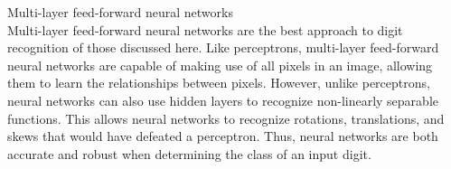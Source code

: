 \documentclass[solution, letterpaper]{cs121}
\begin{document}
\subproblem Multi-layer feed-forward neural networks \\

Multi-layer feed-forward neural networks are the best approach to digit recognition of those discussed here. Like perceptrons, multi-layer feed-forward neural networks are capable of making use of all pixels in an image, allowing them to learn the relationships between pixels. However, unlike perceptrons, neural networks can also use hidden layers to recognize non-linearly separable functions. This allows neural networks to recognize rotations, translations, and skews that would have defeated a perceptron. Thus, neural networks are both accurate and robust when determining the class of an input digit.

\end{document}
